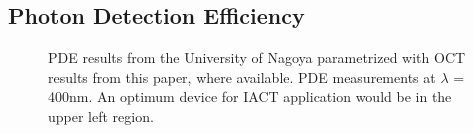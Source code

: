 \documentclass[12pt,article,type=msc,colorback,accentcolor=tud9c]{tudthesis}
\begin{document}
\subsection{Photon Detection Efficiency}
\begin{figure}[h!]
\begin{centering}
\caption{PDE results from the University of Nagoya parametrized with OCT results from this paper, where available. PDE measurements at $\lambda$ = 400nm. An optimum device for IACT application would be in the upper left region.}
\label{fig:Nagoya_PDE_me_OCT}
\end{centering}
\end{figure}
\end{document}
